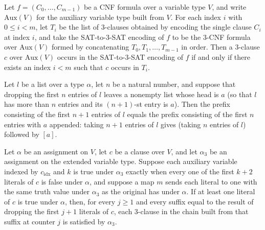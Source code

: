 \begin{lemma}
\label{SATTo3SAT.mem_to3SAT_iff}
\leanok
{}
Let $f = (C_0, \dots, C_{m-1})$ be a CNF formula over a variable type $V$, and write
$\mathrm{Aux}(V)$ for the auxiliary variable type built from $V$. For each index $i$
with $0 \le i < m$, let $T_i$ be the list of $3$-clauses obtained by encoding the single
clause $C_i$ at index $i$, and take the SAT-to-3-SAT encoding of $f$ to be the $3$-CNF
formula over $\mathrm{Aux}(V)$ formed by concatenating $T_0, T_1, \dots, T_{m-1}$ in
order. Then a $3$-clause $c$ over $\mathrm{Aux}(V)$ occurs in the SAT-to-3-SAT encoding
of $f$ if and only if there exists an index $i < m$ such that $c$ occurs in $T_i$.
\end{lemma}

\begin{lemma}
\label{SATTo3SAT.List.take_succ_of_drop_cons}
\leanok
{}
Let $l$ be a list over a type $\alpha$, let $n$ be a natural number, and suppose that
dropping the first $n$ entries of $l$ leaves a nonempty list whose head is $a$ (so that
$l$ has more than $n$ entries and its $(n+1)$-st entry is $a$). Then the prefix
consisting of the first $n+1$ entries of $l$ equals the prefix consisting of the first
$n$ entries with $a$ appended: taking $n+1$ entries of $l$ gives (taking $n$ entries of
$l$) followed by $[a]$.
\end{lemma}

\begin{lemma}
\label{SATTo3SAT.buildChain_all_satisfied}
\leanok
{}
Let $\alpha$ be an assignment on $V$, let $c$ be a clause over $V$, and let $\alpha_3$
be an assignment on the extended variable type. Suppose each auxiliary variable indexed
by $c_{\mathrm{idx}}$ and $k$ is true under $\alpha_3$ exactly when every one of the
first $k+2$ literals of $c$ is false under $\alpha$, and suppose a map $m$ sends each
literal to one with the same truth value under $\alpha_3$ as the original has under
$\alpha$. If at least one literal of $c$ is true under $\alpha$, then, for every $j\ge1$
and every suffix equal to the result of dropping the first $j+1$ literals of $c$, each
3-clause in the chain built from that suffix at counter $j$ is satisfied by $\alpha_3$.
\end{lemma}

